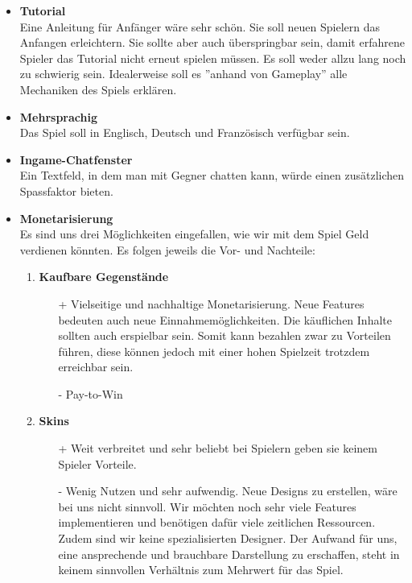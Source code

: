 \begin{itemize}
    \item \textbf{\gls{Tutorial}} \\
        Eine Anleitung für Anfänger wäre sehr schön. Sie soll neuen Spielern das Anfangen erleichtern. Sie sollte aber auch überspringbar sein,
        damit erfahrene Spieler das Tutorial nicht erneut spielen müssen. Es soll weder allzu lang noch zu schwierig sein. Idealerweise soll es ''anhand von Gameplay'' alle Mechaniken des Spiels
        erklären.
    \item \textbf{Mehrsprachig} \\
        Das Spiel soll in Englisch, Deutsch und Französisch verfügbar sein.
    \item \textbf{\gls{Ingame}-Chatfenster}\\
        Ein Textfeld, in dem man mit Gegner chatten kann, würde einen zusätzlichen Spassfaktor bieten.
    \item \textbf{Monetarisierung} \\
    Es sind uns drei Möglichkeiten eingefallen, wie wir mit dem Spiel Geld verdienen könnten. Es folgen jeweils die Vor- und Nachteile:
    \begin{enumerate}
        \item \textbf{Kaufbare Gegenstände}
        \begin{itemize}
            \item[+] Vielseitige und nachhaltige Monetarisierung. Neue Features bedeuten auch neue Einnahmemöglichkeiten. Die käuflichen Inhalte sollten
                        auch erspielbar sein. Somit kann bezahlen zwar zu Vorteilen führen, diese können jedoch mit einer hohen Spielzeit trotzdem erreichbar sein.
            \item[-] \gls{Pay-to-Win}
        \end{itemize}
        \item \textbf{\gls{Skins}}
        \begin{itemize}
            \item[+] Weit verbreitet und sehr beliebt bei Spielern geben sie keinem Spieler Vorteile.
            \item[-] Wenig Nutzen und sehr aufwendig. Neue Designs zu erstellen, wäre bei uns nicht sinnvoll.
                        Wir möchten noch sehr viele Features implementieren und benötigen dafür viele zeitlichen Ressourcen. Zudem sind wir keine spezialisierten Designer. Der Aufwand für uns, eine ansprechende und brauchbare Darstellung zu erschaffen, steht in keinem sinnvollen Verhältnis zum Mehrwert für das Spiel.

\end{itemize}
\end{enumerate}
\end{itemize}
